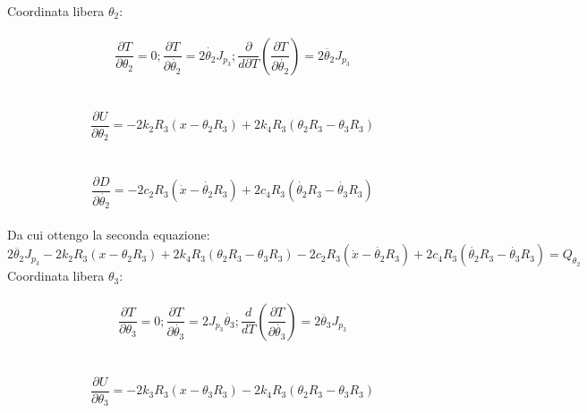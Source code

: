 \documentclass{article}
\begin{document}
\\
Coordinata libera $\theta_2$:
\\
\\
\begin{equation*}
\frac{ \partial T}{\partial \theta_2} = 0 ; \frac{\partial T}{\partial \dot{\theta_2}} = 2\dot{\theta_2}J_{p_3};  \frac{\partial}{d
\partial T}(\frac{\partial T}{\partial \dot{\theta_2}})  = 2\ddot{\theta_2}J_{p_3}
\end{equation*}
\\
\\
\begin{equation*}
\frac{\partial U}{\partial \theta_2} = -2k_2R_3(x-\theta_2R_3) + 2k_4R_3(\theta_2 R_3 - \theta_3 R_3)
\end{equation*}
\\
\\
\begin{equation*}
\frac{\partial D}{\partial \dot{\theta_2}} = -2c_2R_3(\dot{x} - \dot{\theta_2}R_3) + 2c_4R_3(\dot{\theta_2}R_3 - \dot{\theta_3}R_3)
\end{equation*}
\\
Da cui ottengo la seconda equazione: 
\\
\begin{equation*}
 2\ddot{\theta_2}J_{p_3} - 2k_{2}R_{3}(x - \theta_{2}R_{3}) + 2k_{4}R_3(\theta_{2}R_3 - \theta_{3}R_{3}) - 2c_{2}R_{3}(\dot{x}-\dot{\theta_2}R_{3}) + 2c_{4}R_{3}(\dot{\theta_2}R_3 - \dot{\theta_{3}}R_{3}) = Q_{\theta_2}
\end{equation*}
Coordinata libera $\theta_3$:
\\
\\
\begin{equation*}
\frac{ \partial T}{\partial \theta_3} = 0 ; \frac{\partial T}{\partial \dot{\theta_3}} = 2J_{p_3}\dot{\theta_3};  \frac{d}{dT}(\frac{\partial T}{\partial \dot{\theta_3}})  = 2\ddot{\theta_3}J_{p_3}
\end{equation*}
\\
\\
\begin{equation*}
\frac{\partial U}{\partial \theta_3} = -2k_3R_3(x - \theta_3R_3) - 2k_4R_3(\theta_2 R_3 - \theta_3 R_3)
\end{equation*}
\\
\\
\end{document}
